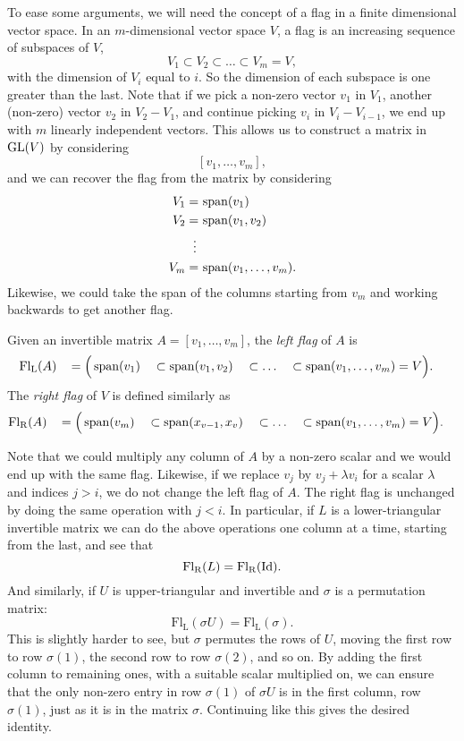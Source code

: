 To ease some arguments, we will need the concept of a flag in a finite
dimensional vector space. In an
$m$-dimensional vector space $V$, a flag is an increasing sequence of
subspaces of $V$,
\[ V_1 \subset V_2 \subset \dots \subset V_m = V, \]
with the dimension of $V_i$ equal to $i$. So the dimension of each
subspace is one greater than the last. Note that if we pick a non-zero
vector $v_1$ in $V_1$, another (non-zero) vector $v_2$ in $V_2 - V_1$,
and continue picking $v_i$ in $V_i - V_{i-1}$, we end up with $m$
linearly independent vectors. This allows us to construct a matrix in
$\operatorname{GL}(V)$ by considering
\[ [v_1,\dots,v_m], \]
and we can recover the flag from the matrix by considering
\begin{align*}
  V_1 =\, &\operatorname{span}(v_1) \\
  V_2 =\, &\operatorname{span}(v_1,v_2) \\
  \vdots\,\, & \\
  V_m =\, &\operatorname{span}(v_1,\dots,v_m).
\end{align*}
Likewise, we could take the span of the columns starting from $v_m$
and working backwards to get another flag.
\begin{definition}
  Given an invertible matrix $A = [v_1,\dots,v_m]$, the \textit{left
    flag} of $A$ is
  \begin{alignat*}{5}
    \mathrm{Fl_L}(A)\, &&= \Big(&\operatorname{span}(v_1) &&\subset \operatorname{span}(v_1,v_2)
    &&\subset \dots &&\subset \operatorname{span}(v_1,\dots,v_m) = V\Big).
  \end{alignat*}
  The \textit{right flag} of $V$ is defined similarly as
  \begin{alignat*}{5}
    \mathrm{Fl_R}(A)\, &&= \Big(&\operatorname{span}(v_m) &&\subset
    \operatorname{span}(x_{v-1},x_v) &&\subset \dots &&\subset
    \operatorname{span}(v_1,\dots,v_m) = V\Big). 
  \end{alignat*}
\end{definition}
Note that we could multiply any column of $A$ by a non-zero scalar and
we would end up with the same flag. Likewise, if we replace $v_j$ by
$v_j + \lambda v_i$ for a scalar $\lambda$ and indices $j > i$, we do not
change the left flag of $A$. The right flag is unchanged by doing
the same operation with $j < i$. In particular, if $L$ is a
lower-triangular invertible matrix we can do the above operations one
column at a time, starting from the last, and see that
\[ \mathrm{Fl_R}(L) = \mathrm{Fl_R}(\operatorname{Id}). \]
And similarly, if $U$ is upper-triangular and invertible and $\sigma$
is a permutation matrix:
\[ \mathrm{Fl_L}(\sigma U) = \mathrm{Fl_L}(\sigma). \]
This is slightly harder to see, but $\sigma$ permutes the rows of $U$,
moving the first row to row $\sigma(1)$, the second row to row
$\sigma(2)$, and so on. By adding the first column to remaining ones,
with a suitable scalar multiplied on, we can ensure that the only
non-zero entry in row $\sigma(1)$ of $\sigma U$ is in the first
column, row $\sigma(1)$, just as it is in the matrix
$\sigma$. Continuing like this gives the desired identity.

